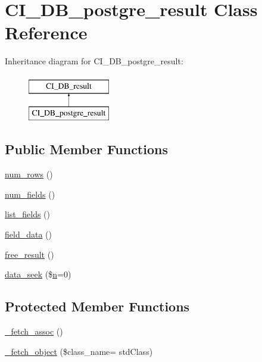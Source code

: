 \hypertarget{class_c_i___d_b__postgre__result}{}\section{C\+I\+\_\+\+D\+B\+\_\+postgre\+\_\+result Class Reference}
\label{class_c_i___d_b__postgre__result}
Inheritance diagram for C\+I\+\_\+\+D\+B\+\_\+postgre\+\_\+result\+:\begin{figure}[H]
\begin{center}
\leavevmode
\includegraphics[height=2.000000cm]{class_c_i___d_b__postgre__result}
\end{center}
\end{figure}
\subsection*{Public Member Functions}
\begin{DoxyCompactItemize}
\item 
\hyperlink{class_c_i___d_b__postgre__result_a218657c303ee499b97710ab0cd2f5d6e}{num\+\_\+rows} ()
\item 
\hyperlink{class_c_i___d_b__postgre__result_af831bf363e4d7d661a717a4932af449d}{num\+\_\+fields} ()
\item 
\hyperlink{class_c_i___d_b__postgre__result_a50b54eb4ea7cfd039740f532988ea776}{list\+\_\+fields} ()
\item 
\hyperlink{class_c_i___d_b__postgre__result_a84bffd65e53902ade1591716749a33e3}{field\+\_\+data} ()
\item 
\hyperlink{class_c_i___d_b__postgre__result_aad2d98d6beb3d6095405356c6107b473}{free\+\_\+result} ()
\item 
\hyperlink{class_c_i___d_b__postgre__result_a8255ae91816e4206e29eb7581c5af0f1}{data\+\_\+seek} (\$\hyperlink{cli_2error__general_8php_ace0fd03cd383f20ce6ea63247a207294}{n}=0)
\end{DoxyCompactItemize}
\subsection*{Protected Member Functions}
\begin{DoxyCompactItemize}
\item 
\hyperlink{class_c_i___d_b__postgre__result_a43a9a92817f1334a1c10752ec44275a0}{\+\_\+fetch\+\_\+assoc} ()
\item 
\hyperlink{class_c_i___d_b__postgre__result_ac0acae0a13c8bfe4c34198813ecf43a0}{\+\_\+fetch\+\_\+object} (\$class\+\_\+name= \textquotesingle{}std\+Class\textquotesingle{})
\end{DoxyCompactItemize}
